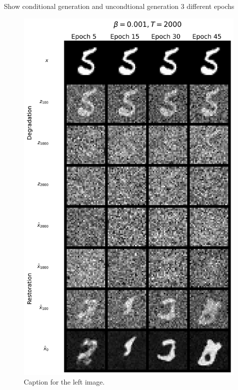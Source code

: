 \documentclass[11pt]{article}
\begin{document}
Show conditional generation and uncondtional generation 3 different epochs
\begin{figure}[H]
    \centering
    \begin{minipage}{0.48\textwidth}
        \includegraphics[width=\linewidth]{figs/q1b_good_cond_samples.png}
        \caption{Caption for the left image.}
        \label{fig:left_img}
    \end{minipage}\hfill
    \begin{minipage}{0.48\textwidth}

\end{minipage}
\end{figure}
\end{document}
